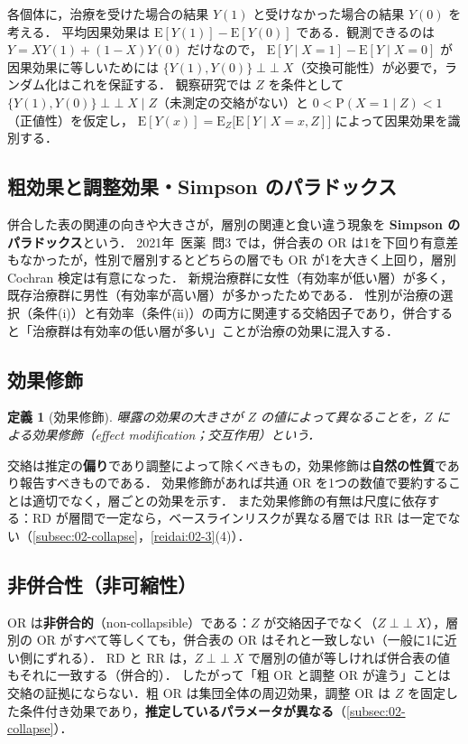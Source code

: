 \documentclass[a4paper,11pt,openany]{ltjsbook}
\newtheorem{teigi}{定義}[chapter]
\newcommand{\tagbox}[2]{\tcbox[on line,boxsep=0.5pt,left=2pt,right=2pt,top=0.5pt,bottom=0.5pt,
  colframe=#1,colback=#1!10,boxrule=0.4pt,arc=1pt]{\scriptsize\bfseries\textcolor{#1}{#2}}}
\newcommand{\Hissu}{\tagbox{bkred}{必須}}
\newcommand{\Hinshutsu}{\tagbox{bkorange}{頻出}}
\newcommand{\kakomon}[2]{\mbox{#1年 医薬 問#2}}
\newcommand{\E}{\mathrm{E}}
\newcommand{\Prob}{\mathrm{P}}
\newcommand{\indep}{\mathop{\perp\!\!\!\perp}}
\begin{document}
\begin{supbox}[補足：潜在結果による定式化]
各個体に，治療を受けた場合の結果 $Y(1)$ と受けなかった場合の結果 $Y(0)$ を考える．
平均因果効果は $\E[Y(1)]-\E[Y(0)]$ である．観測できるのは $Y=XY(1)+(1-X)Y(0)$ だけなので，
$\E[Y\mid X=1]-\E[Y\mid X=0]$ が因果効果に等しいためには $\{Y(1),Y(0)\}\indep X$（交換可能性）が必要で，ランダム化はこれを保証する．
観察研究では $Z$ を条件として $\{Y(1),Y(0)\}\indep X\mid Z$（未測定の交絡がない）と $0<\Prob(X=1\mid Z)<1$（正値性）を仮定し，
$\E[Y(x)]=\E_Z\bigl[\E[Y\mid X=x,Z]\bigr]$ によって因果効果を識別する．
\end{supbox}

\subsection{粗効果と調整効果・Simpson のパラドックス}\label{subsec:07-simpson}
\Hinshutsu 併合した表の関連の向きや大きさが，層別の関連と食い違う現象を \textbf{Simpson のパラドックス}という．
\kakomon{2021}{3} では，併合表の OR は1を下回り有意差もなかったが，性別で層別するとどちらの層でも OR が1を大きく上回り，層別 Cochran 検定は有意になった．
新規治療群に女性（有効率が低い層）が多く，既存治療群に男性（有効率が高い層）が多かったためである．
性別が治療の選択（条件(i)）と有効率（条件(ii)）の両方に関連する交絡因子であり，併合すると「治療群は有効率の低い層が多い」ことが治療の効果に混入する．

\subsection{効果修飾}\label{sec:07-modification}
\begin{teigi}[効果修飾]\label{def:07-modification}
曝露の効果の大きさが $Z$ の値によって異なることを，$Z$ による効果修飾（effect modification；交互作用）という．
\end{teigi}
交絡は推定の\textbf{偏り}であり調整によって除くべきもの，効果修飾は\textbf{自然の性質}であり報告すべきものである．
効果修飾があれば共通 OR を1つの数値で要約することは適切でなく，層ごとの効果を示す．
また効果修飾の有無は尺度に依存する：RD が層間で一定なら，ベースラインリスクが異なる層では RR は一定でない（\cref{subsec:02-collapse}，\cref{reidai:02-3}(4)）．

\subsection{非併合性（非可縮性）}\label{subsec:07-noncollapse}
\Hissu OR は\textbf{非併合的}（non-collapsible）である：$Z$ が交絡因子でなく（$Z\indep X$），層別の OR がすべて等しくても，併合表の OR はそれと一致しない（一般に1に近い側にずれる）．
RD と RR は，$Z\indep X$ で層別の値が等しければ併合表の値もそれに一致する（併合的）．
したがって「粗 OR と調整 OR が違う」ことは交絡の証拠にならない．粗 OR は集団全体の周辺効果，調整 OR は $Z$ を固定した条件付き効果であり，\textbf{推定しているパラメータが異なる}（\cref{subsec:02-collapse}）．
\end{document}
